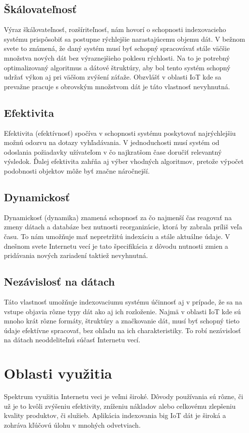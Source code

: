 \documentclass[10pt,twoside,slovak,a4paper]{article}
\begin{document}
\subsection{Škálovateľnosť}
Výraz škálovateľnosť, rozšíriteľnosť, nám hovorí o schopnosti indexovacieho systému prispôsobiť sa postupne rýchlejšie narastajúcemu objemu dát. V bežnom svete to známená, že daný systém musí byť schopný spracovávať stále väčšie množstva nových dát bez výraznejšieho poklesu rýchlosti.\cite{8807848} Na to je potrebný optimalizovaný algoritmus a dátové štruktúry, aby bol tento systém schopný udržať výkon aj pri väčšom zvýšení záťaže. Obzvlášť v oblasti IoT kde sa prevažne pracuje s obrovským množstvom dát je táto vlastnosť nevyhnutná.

\subsection{Efektivita}
Efektivita (efektívnosť) spočíva v schopnosti systému poskytovať najrýchlejšiu možnú odozvu na dotazy vyhľadávania. \cite{Khettabi2022ClusteringAP} V jednoduchosti musí systém od odoslania požiadavky užívateľom v čo najkratšom čase doručiť relevantný výsledok. Ďalej efektivita zahŕňa aj výber vhodných algoritmov, pretože výpočet podobnosti objektov môže byť značne náročnejší.

\subsection{Dynamickosť}
Dynamickosť (dynamika) znamená schopnosť za čo najmenší čas reagovať na zmeny dátach a databáze bez nutnosti reorganizácie, ktorá by zabrala príliš veľa času. To nám umožňuje mať nepretržitú indexáciu a stále aktuálne údaje.\cite{8807848} V dnešnom svete Internetu vecí je tato špecifikácia z dôvodu nutnosti zmien a pridávania nových zariadení taktiež nevyhnutná.

\subsection{Nezávislosť na dátach}
Táto vlastnosť umožňuje indexovaciumu systému účinnosť aj v prípade, že sa na vstupe objavia rôzne typy dát ako aj ich rozloženie. Najmä v oblasti IoT kde sú mnoho krát rôzne formáty, štruktúry a značkovanie dát, musí byť schopný tieto údaje efektívne spracovať, bez ohľadu na ich charakteristiky.\cite{2021} To robí nezávislosť na dátach neoddeliteľnú súčasť Internetu vecí.


\section{Oblasti využitia} \label{oblasti}
Spektrum využitia Internetu veci je veľmi široké. Dôvody používania sú rôzne, či už je to kvôli zvýšeniu efektivity, zníženiu nákladov alebo celkovému zlepšeniu kvality produktov, či služieb. Aplikácia indexovania big IoT dát je široká a zohráva kľúčovú úlohu v mnohých odvetviach. 
\end{document}
